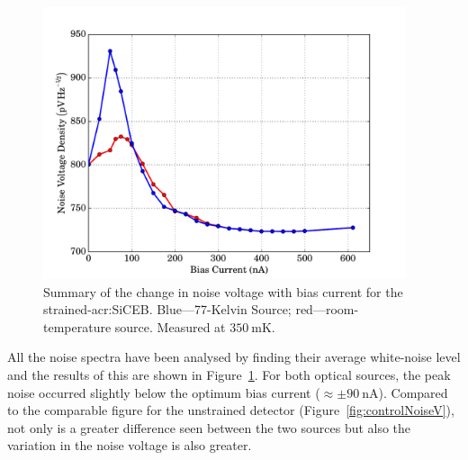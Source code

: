 \par 
\begin{figure}[tb]
\begin{center}
\includegraphics[width = 0.95\textwidth]{figures/strained_noiseVoltage}
\caption[Summary of the change in noise voltage with bias current for the strained-\gls{acr:SiCEB}]{Summary of the change in noise voltage with bias current for the strained-\gls{acr:SiCEB}. Blue---77-Kelvin Source; red---room-temperature source. Measured at $350~\mathrm{mK}$.}
\label{fig:strainedlNoiseV}
\end{center}
\end{figure}
All the noise spectra have been analysed by finding their average white-noise level and the results of this are shown in Figure~\ref{fig:strainedlNoiseV}. For both optical sources, the peak noise occurred slightly below the optimum bias current ($\approx\pm 90~\mathrm{nA}$). Compared to the comparable figure for the unstrained detector (Figure~\ref{fig:controlNoiseV}), not only is a greater difference seen between the two sources but also the variation in the noise voltage is also greater. 
